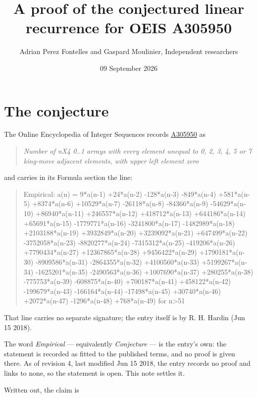 \documentclass[11pt]{article}
\title{A proof of the conjectured linear recurrence for OEIS A305950}
\author{Adrian Perez Fontelles and Gaspard Moulinier, Independent researchers}
\date{09 September 2026}
\theoremstyle{definition}
\begin{document}
\maketitle
\section{The conjecture}

The Online Encyclopedia of Integer Sequences records \href{https://oeis.org/A305950}{A305950} as

\begin{quote}\itshape Number of nX4 0..1 arrays with every element unequal to 0, 2, 3, 4, 5 or 7 king-move adjacent elements, with upper left element zero\end{quote}

and carries in its Formula section the line:

\begin{quote}\ttfamily Empirical: a(n) = 9*a(n-1) +24*a(n-2) -128*a(n-3) -849*a(n-4) +581*a(n-5) +8374*a(n-6) +10529*a(n-7) -26118*a(n-8) -84366*a(n-9) -54629*a(n-10) +86940*a(n-11) +246557*a(n-12) +418712*a(n-13) +644186*a(n-14) +65691*a(n-15) -1779771*a(n-16) -3241800*a(n-17) -1482989*a(n-18) +2103188*a(n-19) +3932849*a(n-20) +3239092*a(n-21) +647499*a(n-22) -3752058*a(n-23) -8820277*a(n-24) -7315312*a(n-25) -419206*a(n-26) +7790434*a(n-27) +12367865*a(n-28) +9456422*a(n-29) +1790181*a(n-30) -8909586*a(n-31) -2864355*a(n-32) +4100560*a(n-33) +5199267*a(n-34) -1625201*a(n-35) -2490563*a(n-36) +1007690*a(n-37) +280255*a(n-38) -775753*a(n-39) -608875*a(n-40) +700187*a(n-41) +458122*a(n-42) -199679*a(n-43) -166164*a(n-44) -17498*a(n-45) +30740*a(n-46) +2072*a(n-47) -1296*a(n-48) +768*a(n-49) for n>51\end{quote}

That line carries no separate signature; the entry itself is by R. H. Hardin (Jun 15 2018).

The word {\itshape Empirical} --- equivalently {\itshape Conjecture} --- is the entry's own: the statement is recorded as fitted to the published terms, and no proof is given there. As of revision 4, last modified Jun 15 2018, the entry records no proof and links to none, so the statement is open. This note settles it.

Written out, the claim is
\end{document}
